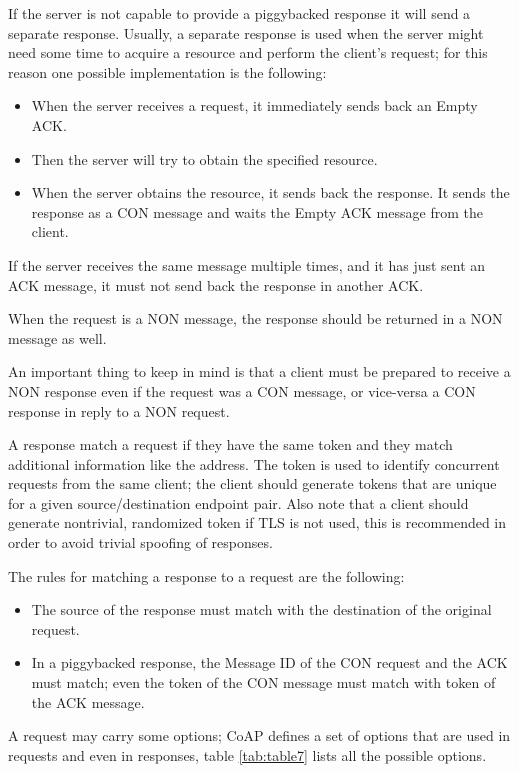 	If the server is not capable to provide a piggybacked response it will send a separate response.\newline
	Usually, a separate response is used when the server might need some time to acquire a resource and perform the client’s request; for this reason one possible implementation is the following:
	\begin{itemize}
		\item When the server receives a request, it immediately sends back an Empty ACK.
		\item Then the server will try to obtain the specified resource.
		\item When the server obtains the resource, it sends back the response.
		It sends the response as a CON message and waits the Empty ACK message from the client.
	\end{itemize}
	If the server receives the same message multiple times, and it has just sent an ACK message, it must not send back the response in another ACK.
	
	When the request is a NON message, the response should be returned in a NON message as well.
	
	An important thing to keep in mind is that a client must be prepared to receive a NON response even if the request was a CON message, or vice-versa a CON response in reply to a NON request.
	
	A response match a request if they have the same token and they match additional information like the address.\newline
	The token is used to identify concurrent requests from the same client; the client should generate tokens that are unique for a given source/destination endpoint pair.\newline
	Also note that a client should generate nontrivial, randomized token if TLS is not used, this is recommended in order to avoid trivial spoofing of responses.\newline
	
	The rules for matching a response to a request are the following:
	\begin{itemize}
		\item The source of the response must match with the destination of the original request.
		\item In a piggybacked response, the Message ID of the CON request and the ACK must match; even the token of the CON message must match with token of the ACK message.
	\end{itemize}
	A request may carry some options; CoAP defines a set of options that are used in requests and even in responses, table \ref{tab:table7} lists all the possible options.
	
